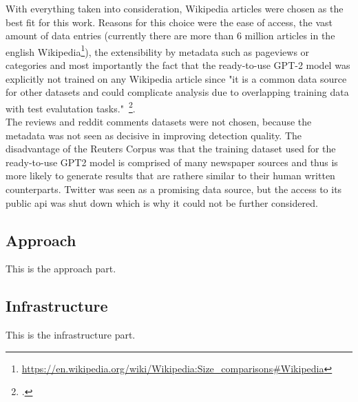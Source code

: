 With everything taken into consideration, Wikipedia articles were chosen as the best fit for this work.
Reasons for this choice were the ease of access, the vast amount of data entries (currently there are more than 6 million articles in the english Wikipedia\footnote{\url{https://en.wikipedia.org/wiki/Wikipedia:Size_comparisons\#Wikipedia}}), the extensibility by metadata such as pageviews or categories and most importantly the fact that the ready-to-use GPT-2 model was explicitly not trained on any Wikipedia article since "it is a common data source for other datasets and could complicate analysis due to overlapping training data with test evalutation tasks."~\footcite{radford2019language}. \\
The reviews and reddit comments datasets were not chosen, because the metadata was not seen as decisive in improving detection quality. The disadvantage of the Reuters Corpus was that the training dataset used for the ready-to-use GPT2 model is comprised of many newspaper sources and thus is more likely to generate results that are rathere similar to their human written counterparts. Twitter was seen as a promising data source, but the access to its public api was shut down which is why it could not be further considered.







\subsection{Approach}
\label{sec:approach}





This is the approach part.

\subsection{Infrastructure}
\label{sec:infrastructure}

This is the infrastructure part.